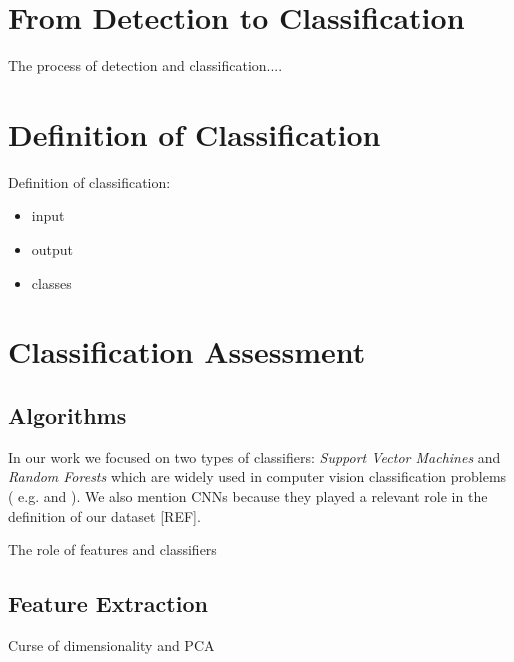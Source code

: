 \vspace{0.5cm}



\section{From Detection to Classification}

The process of detection and classification....

\vspace{0.5cm}

\section{Definition of Classification}

Definition of classification:
\begin{itemize}
\item input
\item output
\item classes
\end{itemize}

\vspace{0.5cm}

\section{Classification Assessment}

\subsection{Algorithms}






In our work we focused on two types of classifiers: \textit{Support Vector Machines} and \textit{Random Forests}
which are widely used in computer vision classification problems ( e.g. \cite{mitosisDetectionLearningBased} and \cite{randForests04}).
We also mention \Glspl{CNN} because they played a relevant role in the definition of our dataset [REF].


 

The role of features and classifiers

\subsection{Feature Extraction}

Curse of dimensionality and PCA










